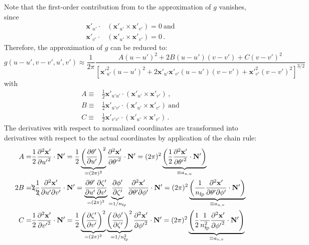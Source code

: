 Note that the first-order contribution from  to the approximation of $g$ vanishes, since
\begin{align*}
  \mathbf{x}'_{u'} \cdot& \left( \mathbf{x}'_{u'} \times \mathbf{x}'_{v'} \right) = 0 ~ \mathrm{and}\\
  \mathbf{x}'_{v'} \cdot& \left( \mathbf{x}'_{u'} \times \mathbf{x}'_{v'} \right) = 0 \, .
\end{align*}
Therefore, the approximation of $g$ can be reduced to:
\begin{equation}
  g(u-u',v-v',u',v') \approx \frac{1}{2 \pi}
    \frac{A (u-u')^2 + 2 B (u-u') (v-v') + C (v-v')^2}
         {\left[ {\mathbf{x}'}^2_{u'} (u-u')^2 + 2 \mathbf{x}'_{u'} \mathbf{x}'_{v'} (u-u') (v-v') + {\mathbf{x}'}^2_{v'} (v-v')^2 \right]^{3/2}}
  \label{eqn:approx_g}
\end{equation}
with
\begin{align}
  A \equiv& \frac{1}{2} \mathbf{x}'_{u' u'} \cdot \left( \mathbf{x}'_{u'} \times \mathbf{x}'_{v'} \right) \, , \nonumber \\
  B \equiv& \frac{1}{2} \mathbf{x}'_{u' v'} \cdot \left( \mathbf{x}'_{u'} \times \mathbf{x}'_{v'} \right) ~ \mathrm{and} \label{eqn:def_ABC}\\
  C \equiv& \frac{1}{2} \mathbf{x}'_{v' v'} \cdot \left( \mathbf{x}'_{u'} \times \mathbf{x}'_{v'} \right) \, . \nonumber
\end{align}
The derivatives with respect to normalized coordinates are transformed into derivatives
with respect to the actual coordinates by application of the chain rule:
\begin{align}
  A =& \frac{1}{2} \frac{\partial^2 \mathbf{x}'}{\partial {u'}^2} \cdot \mathbf{N}'
    =  \frac{1}{2} \underbrace{ \left( \frac{\partial \theta'}{\partial u'} \right)^2}_{=(2\pi)^2} \frac{\partial^2 \mathbf{x}'}{\partial {\theta'}^2} \cdot \mathbf{N}'
    =  (2\pi)^2 \underbrace{\left( \frac{1}{2} \frac{\partial^2 \mathbf{x}'}{\partial {\theta'}^2} \cdot \mathbf{N}' \right)}_{\equiv a_{u,u}} \\
 2B =& \bcancel{2} \frac{1}{\bcancel{2}} \frac{\partial^2 \mathbf{x}'}{\partial u' \partial v'} \cdot \mathbf{N}'
    =  \underbrace{ \frac{\partial \theta'}{\partial u'} \frac{\partial \zeta'}{\partial v'} }_{=(2\pi)^2}
       \underbrace{ \frac{\partial \phi'}{\partial \zeta'} }_{=1/n_\mathrm{fp}}
       \frac{\partial^2 \mathbf{x}'}{\partial \theta' \partial \phi'} \cdot \mathbf{N}'
    =  (2\pi)^2 \underbrace{\left(\frac{1}{n_\mathrm{fp}} \frac{\partial^2 \mathbf{x}'}{\partial \theta' \partial \phi'} \cdot \mathbf{N}' \right)}_{\equiv a_{u,v}} \\
  C =& \frac{1}{2} \frac{\partial^2 \mathbf{x}'}{\partial {v'}^2} \cdot \mathbf{N}'
    =  \frac{1}{2}
       \underbrace{ \left( \frac{\partial \zeta'}{\partial v'} \right)^2}_{=(2\pi)^2}
       \underbrace{ \left( \frac{\partial \phi'}{\partial \zeta'}\right)^2 }_{=1/n_\mathrm{fp}^2}\frac{\partial^2 \mathbf{x}'}{\partial {\phi'}^2} \cdot \mathbf{N}'
    =  (2\pi)^2 \underbrace{\left( \frac{1}{2} \frac{1}{n_\mathrm{fp}^2} \frac{\partial^2 \mathbf{x}'}{\partial {\phi'}^2} \cdot \mathbf{N}' \right)}_{\equiv a_{v,v}}
\end{align}
